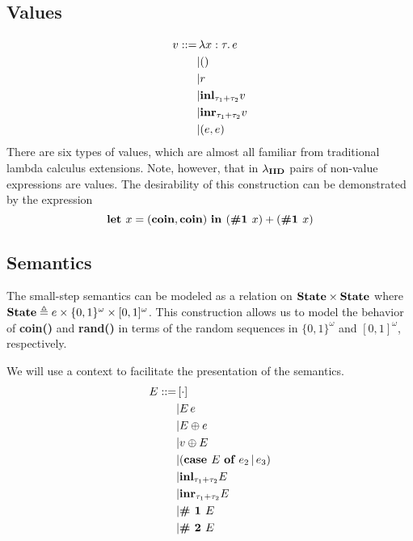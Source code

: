 \documentclass{article}
\begin{document}
		\subsection{Values}
			\begin{equation*}
				\begin{split}
					v ::=
					&\, \lambda x:\tau.\, e \\
					&| () \\
					&| r \\
					&| \text{\bf inl}_{\tau_1 + \tau_2} v \\
					&| \text{\bf inr}_{\tau_1 + \tau_2} v \\
					&| (e, e) \\
				\end{split}
			\end{equation*}
			There are six types of values, which are almost all familiar from traditional lambda calculus extensions.
			Note, however, that in $\lambda_{\bf IID}$ pairs of non-value expressions are values.
			The desirability of this construction can be demonstrated by the expression
			$$\text{\bf let } x = ({\bf coin}, {\bf coin}) \text{ \bf in } (\text {\bf \#1 } x) + (\text{\bf \#1 } x)$$


		\subsection{Semantics}
		The small-step semantics can be modeled as a relation on ${\bf State} \times {\bf State}$ where ${\bf State} \triangleq e \times \{0,1\}^\omega \times [0, 1]^\omega$. This construction allows us to model the behavior of {\bf coin()} and {\bf rand()} in terms of the random sequences in $\{0,1\}^\omega$ and $[0,1]^\omega$, respectively.
		
		We will use a context to facilitate the presentation of the semantics.
		\begin{equation*}
			\begin{split}
				E ::=
				&\, [\cdot] \\
				&| E\, e \\
				&| E \oplus e \\
				&| v \oplus E \\
				&| (\text{\bf case } E \text{ \bf of } e_2 \,|\, e_3) \\
				&| {\bf inl}_{\tau_1 + \tau_2} E \\
				&| {\bf inr}_{\tau_1 + \tau_2} E \\
				&| \text{\bf \# 1 } E \\
				&| \text{\bf \# 2 } E \\
			\end{split}
		\end{equation*}
		
\end{document}
